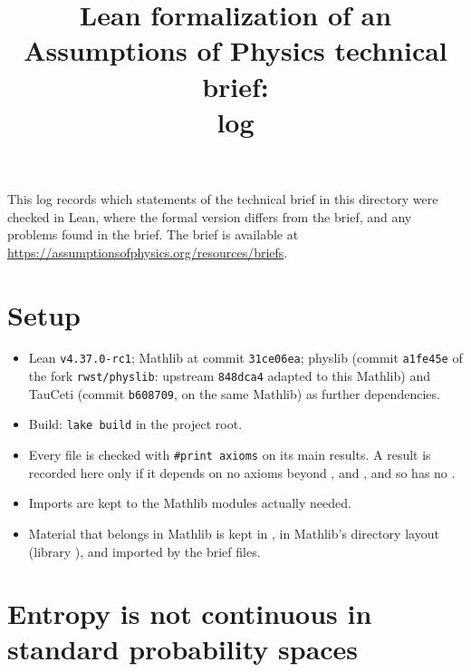 \documentclass[11pt]{article}
\title{Lean formalization of an Assumptions of Physics technical brief:\\ log}
\author{}
\date{}
\begin{document}
\maketitle

\noindent
This log records which statements of the technical brief in this directory were checked in Lean,
where the formal version differs from the brief, and any problems found in the brief.
The brief is available at \url{https://assumptionsofphysics.org/resources/briefs}.

\section*{Setup}

\begin{itemize}
\item Lean \texttt{v4.37.0-rc1}; Mathlib at commit \texttt{31ce06ea}; physlib (commit \texttt{a1fe45e}
  of the fork \texttt{rwst/physlib}: upstream \texttt{848dca4} adapted to this Mathlib) and
  TauCeti (commit \texttt{b608709}, on the same Mathlib) as further dependencies.
\item Build: \texttt{lake build} in the project root.
\item Every file is checked with \texttt{\#print axioms} on its main results. A result is
  recorded here only if it depends on no axioms beyond ,
   and , and so has no .
\item Imports are kept to the Mathlib modules actually needed.
\item Material that belongs in Mathlib is kept in , in Mathlib's directory
  layout (library ), and imported by the brief files.
\end{itemize}



\section{Entropy is not continuous in standard probability spaces}
\end{document}
